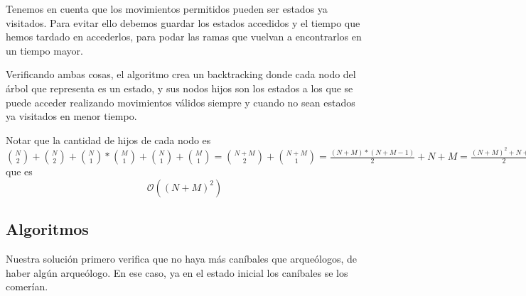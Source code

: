 Tenemos en cuenta que los movimientos permitidos pueden ser estados ya visitados. Para evitar ello debemos guardar los estados accedidos y el tiempo que hemos tardado en accederlos, para podar las ramas que vuelvan a encontrarlos en un tiempo mayor.

Verificando ambas cosas, el algoritmo crea un backtracking donde cada nodo del árbol que representa es un estado, y sus nodos hijos son los estados a los que se puede acceder realizando movimientos válidos siempre y cuando no sean estados ya visitados en menor tiempo.

\vspace*{5mm}
\begin{center}
\end{center}
\vspace*{5mm}

Notar que la cantidad de hijos de cada nodo es $\binom{N}{2} + \binom{N}{2} + \binom{N}{1} * \binom{M}{1} + \binom{N}{1} + \binom{M}{1} = \binom{N+M}{2} + \binom{N+M}{1} = \frac{(N+M)*(N+M-1)}{2} + N + M  = \frac{{(N+M)}^2 + N + M}{2}$ que es 
\[
\mathcal{O}({(N+M)}^2)
\]

\newpage
\subsection{Algoritmos}
Nuestra solución primero verifica que no haya más caníbales que arqueólogos, de haber algún arqueólogo.
En ese caso, ya en el estado inicial los caníbales se los comerían.

